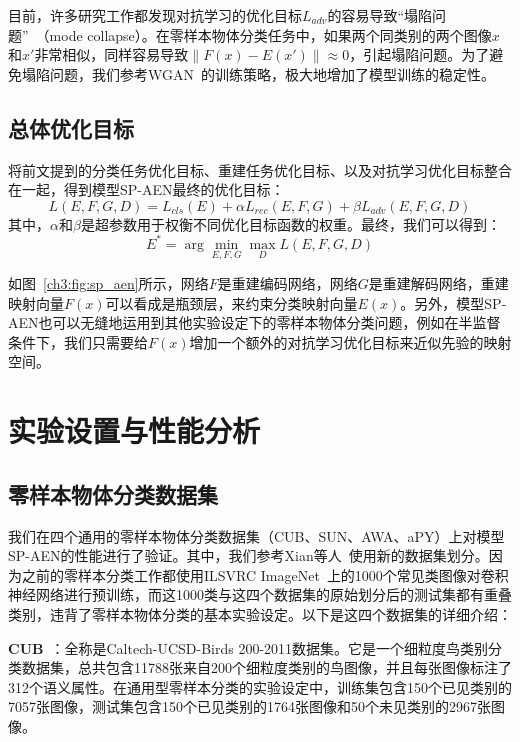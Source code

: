目前，许多研究工作都发现对抗学习的优化目标$L_{adv}$的容易导致“塌陷问题”~\cite{arjovsky2017wasserstein}（mode collapse）。在零样本物体分类任务中，如果两个同类别的两个图像$x$和$x'$非常相似，同样容易导致$\|F(x)-E(x')\|\approx 0$，引起塌陷问题。为了避免塌陷问题，我们参考WGAN~\cite{arjovsky2017wasserstein}的训练策略，极大地增加了模型训练的稳定性。


\subsection{总体优化目标}
将前文提到的分类任务优化目标、重建任务优化目标、以及对抗学习优化目标整合在一起，得到模型SP-AEN最终的优化目标：
\begin{equation} \label{ch3:eq:eq_5}
L (E, F, G, D) = L_{cls}(E) + \alpha L_{rec} (E, F, G) + \beta L_{adv}(E, F, G, D)
\end{equation}
其中，$\alpha$和$\beta$是超参数用于权衡不同优化目标函数的权重。最终，我们可以得到：
\begin{equation}\label{ch3:eq:eq_6}
E^* = \arg\min\limits_{E, F, G}\max\limits_{D} L(E, F, G, D)
\end{equation}

如图~\ref{ch3:fig:sp_aen}所示，网络$F$是重建编码网络，网络$G$是重建解码网络，重建映射向量$F(x)$可以看成是瓶颈层，来约束分类映射向量$E(x)$。另外，模型SP-AEN也可以无缝地运用到其他实验设定下的零样本物体分类问题，例如在半监督条件下，我们只需要给$F(x)$增加一个额外的对抗学习优化目标来近似先验的映射空间。


\section{实验设置与性能分析}
\subsection{零样本物体分类数据集}

我们在四个通用的零样本物体分类数据集（CUB、SUN、AWA、aPY）上对模型SP-AEN的性能进行了验证。其中，我们参考Xian等人~\cite{xian2017zero}使用新的数据集划分。因为之前的零样本分类工作都使用ILSVRC ImageNet~\cite{russakovsky2015imagenet}上的1000个常见类图像对卷积神经网络进行预训练，而这1000类与这四个数据集的原始划分后的测试集都有重叠类别，违背了零样本物体分类的基本实验设定。以下是这四个数据集的详细介绍：

\textbf{CUB}~\cite{wah2011caltech}：全称是Caltech-UCSD-Birds 200-2011数据集。它是一个细粒度鸟类别分类数据集，总共包含11788张来自200个细粒度类别的鸟图像，并且每张图像标注了312个语义属性。在通用型零样本分类的实验设定中，训练集包含150个已见类别的7057张图像，测试集包含150个已见类别的1764张图像和50个未见类别的2967张图像。

